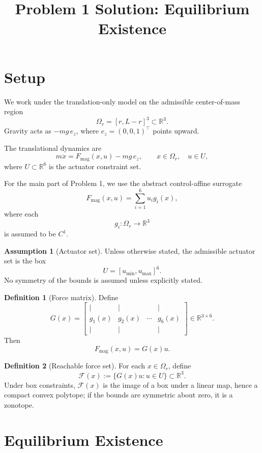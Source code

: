 \documentclass[11pt]{article}
\title{\textbf{Problem 1 Solution: Equilibrium Existence}}
\author{}
\date{}
\theoremstyle{definition}
\newtheorem{definition}{Definition}
\newtheorem{assumption}{Assumption}
\begin{document}
\maketitle

\section{Setup}

We work under the translation-only model on the admissible center-of-mass region
\[
\Omega_r = [r,L-r]^3 \subset \mathbb{R}^3.
\]
Gravity acts as \(-mg\,e_z\), where \(e_z = (0,0,1)^\top\) points upward.

The translational dynamics are
\[
m\ddot{x} = F_{\mathrm{mag}}(x,u) - mg\,e_z,
\qquad x \in \Omega_r,\quad u \in U,
\]
where \(U \subset \mathbb{R}^6\) is the actuator constraint set.

For the main part of Problem 1, we use the abstract control-affine surrogate
\[
F_{\mathrm{mag}}(x,u) = \sum_{i=1}^6 u_i g_i(x),
\]
where each
\[
g_i : \Omega_r \to \mathbb{R}^3
\]
is assumed to be \(C^1\).

\begin{assumption}[Actuator set]
Unless otherwise stated, the admissible actuator set is the box
\[
U = [u_{\min},u_{\max}]^6.
\]
No symmetry of the bounds is assumed unless explicitly stated.
\end{assumption}

\begin{definition}[Force matrix]
Define
\[
G(x)
=
\begin{bmatrix}
| & | & & |\\
g_1(x) & g_2(x) & \cdots & g_6(x)\\
| & | & & |
\end{bmatrix}
\in \mathbb{R}^{3\times 6}.
\]
Then
\[
F_{\mathrm{mag}}(x,u)=G(x)u.
\]
\end{definition}

\begin{definition}[Reachable force set]
For each \(x \in \Omega_r\), define
\[
\mathcal{F}(x)
:=
\{G(x)u : u \in U\}
\subset \mathbb{R}^3.
\]
Under box constraints, \(\mathcal{F}(x)\) is the image of a box under a linear map, hence a compact convex polytope; if the bounds are symmetric about zero, it is a zonotope.
\end{definition}

\section{Equilibrium Existence}
\end{document}
